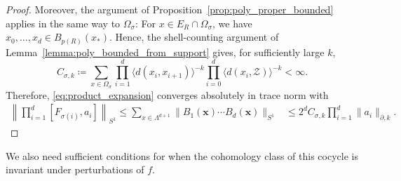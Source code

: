\documentclass[12pt]{amsart}
\newcommand{\Zz}{{\mathcal Z}}
\newcommand{\pdv}{\partial}
\begin{document}
\begin{proof}
Moreover, the argument of Proposition~\ref{prop:poly_proper_bounded} applies in the same way to \(\Omega_\sigma\): For $x\in E_R \cap \Omega_\sigma$, we have $x_0,\ldots,x_d\in B_{p(R)}(x_*)$. 
Hence, the shell-counting argument of Lemma~\ref{lemma:poly_bounded_from_support} gives, for sufficiently large \(k\),
$$C_{\sigma,k} \coloneqq  \sum_{x\in\Omega_\sigma} \prod_{i=1}^d \langle d(x_i,x_{i+1})\rangle^{-k} \prod_{i=0}^d \langle d(x_i,\Zz)\rangle^{-k} <\infty. $$
Therefore, \eqref{eq:product_expansion} converges absolutely in trace norm with
\begin{align*}
\left\|\prod_{i=1}^d[F_{\sigma(i)},a_i] \right\|_{S^1}\leq \sum_{x\in\Lambda^{d+1}} \|B_1(\mathbf x)\cdots B_d(\mathbf x)\|_{S^1} 
&\leq 2^d C_{\sigma,k} \prod_{i=1}^d\|a_i\|_{\pdv,k}.
\end{align*}
\end{proof}


We also need sufficient conditions for when the cohomology class of this cocycle is invariant under perturbations of $f$.
\end{document}
